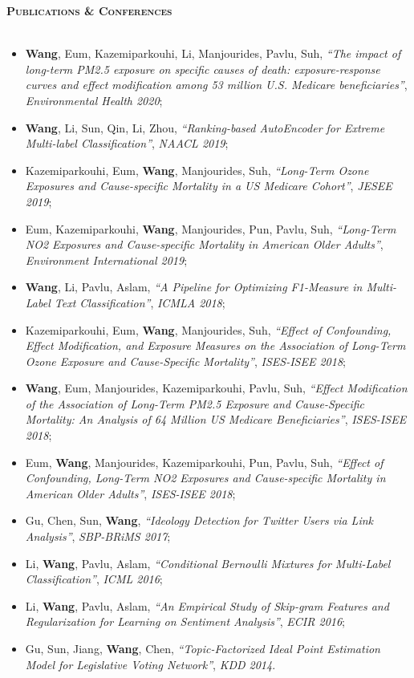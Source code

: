 \documentclass[11pt]{article}
\newcommand{\lineunder}{\vspace*{-8pt} \\ \hspace*{-18pt} \hrulefill \\}
\newcommand{\header}[1]{{\hspace*{-15pt}\vspace*{6pt} \large \textsc{\textbf{#1}}} \vspace*{-6pt} \lineunder}
\begin{document}
\header{Publications \& Conferences}
\begin{itemize}
\item  \textbf{Wang}, Eum, Kazemiparkouhi, Li, Manjourides, Pavlu, Suh, \textit{``The impact of long-term PM2.5 exposure on specific causes of death: exposure-response curves and effect modification among 53 million U.S. Medicare beneficiaries''}, {\emph{Environmental Health 2020}};

\item \textbf{Wang}, Li, Sun, Qin, Li, Zhou, \textit{``Ranking-based AutoEncoder for Extreme Multi-label Classification''}, {\emph{NAACL 2019}};

\item Kazemiparkouhi, Eum, \textbf{Wang}, Manjourides, Suh, \textit{``Long-Term Ozone Exposures and Cause-specific Mortality in a US Medicare Cohort''}, {\emph{JESEE 2019}};

\item Eum, Kazemiparkouhi, \textbf{Wang}, Manjourides, Pun, Pavlu, Suh, \textit{``Long-Term NO2 Exposures and Cause-specific Mortality in American Older Adults''}, {\emph{Environment International 2019}};

\item  \textbf{Wang}, Li, Pavlu, Aslam, \textit{``A Pipeline for Optimizing F1-Measure in Multi-Label Text Classification''}, {\emph{ICMLA 2018}};

\item Kazemiparkouhi, Eum, \textbf{Wang}, Manjourides, Suh, \textit{``Effect of Confounding, Effect Modification, and Exposure Measures on the Association of Long-Term Ozone Exposure and Cause-Specific Mortality''}, {\emph{ISES-ISEE 2018}};

\item  \textbf{Wang}, Eum, Manjourides, Kazemiparkouhi, Pavlu, Suh, \textit{``Effect Modification of the Association of Long-Term PM2.5 Exposure and Cause-Specific Mortality: An Analysis of 64 Million US Medicare Beneficiaries''}, {\emph{ISES-ISEE 2018}};

\item Eum, \textbf{Wang}, Manjourides, Kazemiparkouhi, Pun, Pavlu, Suh, \textit{``Effect of Confounding, Long-Term NO2 Exposures and Cause-specific Mortality in American Older Adults''}, {\emph{ISES-ISEE 2018}};

\item  Gu, Chen, Sun, \textbf{Wang}, \textit{``Ideology Detection for Twitter Users via Link Analysis''}, {\emph{SBP-BRiMS 2017}};

\item Li, \textbf{Wang}, Pavlu, Aslam, \textit{``Conditional Bernoulli Mixtures for Multi-Label Classification''}, {\emph{ICML 2016}};

\item Li, \textbf{Wang}, Pavlu, Aslam, \textit{``An Empirical Study of Skip-gram Features and Regularization for Learning on Sentiment Analysis''}, {\emph{ECIR 2016}};

\item Gu, Sun, Jiang, \textbf{Wang}, Chen, \textit{``Topic-Factorized Ideal Point Estimation Model for Legislative Voting Network''}, {\emph{KDD 2014}}.

\end{itemize}
\end{document}

